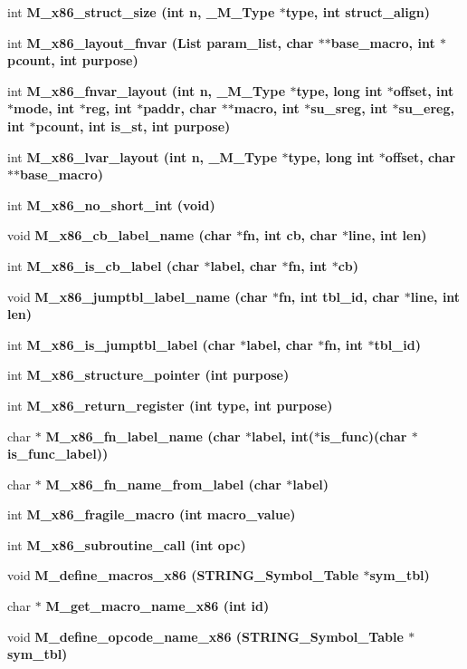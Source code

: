 \begin{CompactItemize}
\item 
int \bf{M\_\-x86\_\-struct\_\-size} (int n, \bf{\_\-M\_\-Type} $\ast$type, int struct\_\-align)
\item 
int \bf{M\_\-x86\_\-layout\_\-fnvar} (\bf{List} param\_\-list, char $\ast$$\ast$base\_\-macro, int $\ast$pcount, int purpose)
\item 
int \bf{M\_\-x86\_\-fnvar\_\-layout} (int n, \bf{\_\-M\_\-Type} $\ast$type, long int $\ast$offset, int $\ast$\bf{mode}, int $\ast$reg, int $\ast$paddr, char $\ast$$\ast$macro, int $\ast$su\_\-sreg, int $\ast$su\_\-ereg, int $\ast$pcount, int is\_\-st, int purpose)
\item 
int \bf{M\_\-x86\_\-lvar\_\-layout} (int n, \bf{\_\-M\_\-Type} $\ast$type, long int $\ast$offset, char $\ast$$\ast$base\_\-macro)
\item 
int \bf{M\_\-x86\_\-no\_\-short\_\-int} (void)
\item 
void \bf{M\_\-x86\_\-cb\_\-label\_\-name} (char $\ast$fn, int cb, char $\ast$line, int len)
\item 
int \bf{M\_\-x86\_\-is\_\-cb\_\-label} (char $\ast$label, char $\ast$fn, int $\ast$cb)
\item 
void \bf{M\_\-x86\_\-jumptbl\_\-label\_\-name} (char $\ast$fn, int tbl\_\-id, char $\ast$line, int len)
\item 
int \bf{M\_\-x86\_\-is\_\-jumptbl\_\-label} (char $\ast$label, char $\ast$fn, int $\ast$tbl\_\-id)
\item 
int \bf{M\_\-x86\_\-structure\_\-pointer} (int purpose)
\item 
int \bf{M\_\-x86\_\-return\_\-register} (int type, int purpose)
\item 
char $\ast$ \bf{M\_\-x86\_\-fn\_\-label\_\-name} (char $\ast$label, int($\ast$is\_\-func)(char $\ast$is\_\-func\_\-label))
\item 
char $\ast$ \bf{M\_\-x86\_\-fn\_\-name\_\-from\_\-label} (char $\ast$label)
\item 
int \bf{M\_\-x86\_\-fragile\_\-macro} (int macro\_\-value)
\item 
int \bf{M\_\-x86\_\-subroutine\_\-call} (int opc)
\item 
void \bf{M\_\-define\_\-macros\_\-x86} (\bf{STRING\_\-Symbol\_\-Table} $\ast$sym\_\-tbl)
\item 
char $\ast$ \bf{M\_\-get\_\-macro\_\-name\_\-x86} (int id)
\item 
void \bf{M\_\-define\_\-opcode\_\-name\_\-x86} (\bf{STRING\_\-Symbol\_\-Table} $\ast$sym\_\-tbl)
\item 
$$
\end{CompactItemize}
